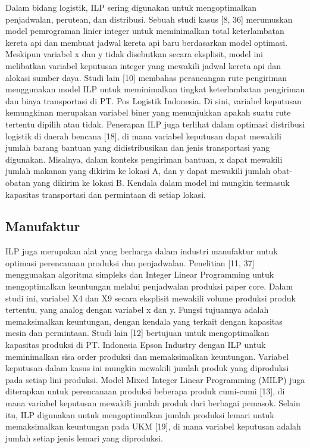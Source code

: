 \documentclass{IEEEtran}
\begin{document}
Dalam bidang logistik, ILP sering digunakan untuk mengoptimalkan penjadwalan, perutean, dan distribusi. Sebuah studi kasus [8, 36] merumuskan model pemrograman linier integer untuk meminimalkan total keterlambatan kereta api dan membuat jadwal kereta api baru berdasarkan model optimasi. Meskipun variabel x dan y tidak disebutkan secara eksplisit, model ini melibatkan variabel keputusan integer yang mewakili jadwal kereta api dan alokasi sumber daya. Studi lain [10] membahas perancangan rute pengiriman menggunakan model ILP untuk meminimalkan tingkat keterlambatan pengiriman dan biaya transportasi di PT. Pos Logistik Indonesia. Di sini, variabel keputusan kemungkinan merupakan variabel biner yang menunjukkan apakah suatu rute tertentu dipilih atau tidak. Penerapan ILP juga terlihat dalam optimasi distribusi logistik di daerah bencana [18], di mana variabel keputusan dapat mewakili jumlah barang bantuan yang didistribusikan dan jenis transportasi yang digunakan. Misalnya, dalam konteks pengiriman bantuan, x dapat mewakili jumlah makanan yang dikirim ke lokasi A, dan y dapat mewakili jumlah obat-obatan yang dikirim ke lokasi B. Kendala dalam model ini mungkin termasuk kapasitas transportasi dan permintaan di setiap lokasi.

\subsection{Manufaktur}

ILP juga merupakan alat yang berharga dalam industri manufaktur untuk optimasi perencanaan produksi dan penjadwalan. Penelitian [11, 37] menggunakan algoritma simpleks dan Integer Linear Programming untuk mengoptimalkan keuntungan melalui penjadwalan produksi paper core. Dalam studi ini, variabel X4 dan X9 secara eksplisit mewakili volume produksi produk tertentu, yang analog dengan variabel x dan y. Fungsi tujuannya adalah memaksimalkan keuntungan, dengan kendala yang terkait dengan kapasitas mesin dan permintaan. Studi lain [12] bertujuan untuk mengoptimalkan kapasitas produksi di PT. Indonesia Epson Industry dengan ILP untuk meminimalkan sisa order produksi dan memaksimalkan keuntungan. Variabel keputusan dalam kasus ini mungkin mewakili jumlah produk yang diproduksi pada setiap lini produksi. Model Mixed Integer Linear Programming (MILP) juga diterapkan untuk perencanaan produksi beberapa produk cumi-cumi [13], di mana variabel keputusan mewakili jumlah produk dari berbagai pemasok. Selain itu, ILP digunakan untuk mengoptimalkan jumlah produksi lemari untuk memaksimalkan keuntungan pada UKM [19], di mana variabel keputusan adalah jumlah setiap jenis lemari yang diproduksi.
\end{document}
